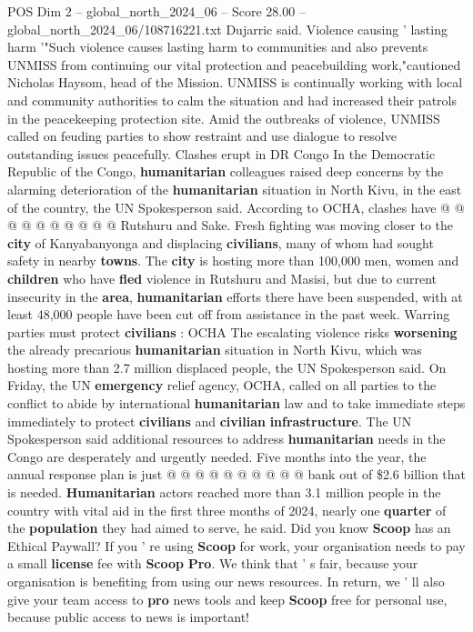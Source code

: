\begin{textsample}{POS Dim 2 – global\_north\_2024\_06 – Score 28.00 – global\_north\_2024\_06/108716221.txt}
Dujarric said.
Violence causing ' lasting harm '"Such violence causes lasting harm to communities and also prevents UNMISS from continuing our vital protection and peacebuilding work,"cautioned Nicholas Haysom, head of the Mission.
UNMISS is continually working with local and community authorities to calm the situation and had increased their patrols in the peacekeeping protection site.
Amid the outbreaks of violence, UNMISS called on feuding parties to show restraint and use dialogue to resolve outstanding issues peacefully.
Clashes erupt in DR Congo In the Democratic Republic of the Congo, \textbf{humanitarian} colleagues raised deep concerns by the alarming deterioration of the \textbf{humanitarian} situation in North Kivu, in the east of the country, the UN Spokesperson said.
According to OCHA, clashes have @ @ @ @ @ @ @ @ @ @ Rutshuru and Sake.
Fresh fighting was moving closer to the \textbf{city} of Kanyabanyonga and displacing \textbf{civilians}, many of whom had sought safety in nearby \textbf{towns}.
The \textbf{city} is hosting more than 100,000 men, women and \textbf{children} who have \textbf{fled} violence in Rutshuru and Masisi, but due to current insecurity in the \textbf{area}, \textbf{humanitarian} efforts there have been suspended, with at least 48,000 people have been cut off from assistance in the past week.
Warring parties must protect \textbf{civilians} : OCHA The escalating violence risks \textbf{worsening} the already precarious \textbf{humanitarian} situation in North Kivu, which was hosting more than 2.7 million displaced people, the UN Spokesperson said.
On Friday, the UN \textbf{emergency} relief agency, OCHA, called on all parties to the conflict to abide by international \textbf{humanitarian} law and to take immediate steps immediately to protect \textbf{civilians} and \textbf{civilian} \textbf{infrastructure}.
The UN Spokesperson said additional resources to address \textbf{humanitarian} needs in the Congo are desperately and urgently needed.
Five months into the year, the annual response plan is just @ @ @ @ @ @ @ @ @ @ bank out of \$2.6 billion that is needed. \textbf{Humanitarian} actors reached more than 3.1 million people in the country with vital aid in the first three months of 2024, nearly one \textbf{quarter} of the \textbf{population} they had aimed to serve, he said.
Did you know \textbf{Scoop} has an Ethical Paywall?
If you ' re using \textbf{Scoop} for work, your organisation needs to pay a small \textbf{license} fee with \textbf{Scoop} \textbf{Pro}.
We think that ' s fair, because your organisation is benefiting from using our news resources.
In return, we ' ll also give your team access to \textbf{pro} news tools and keep \textbf{Scoop} free for personal use, because public access to news is important!

\end{textsample}
